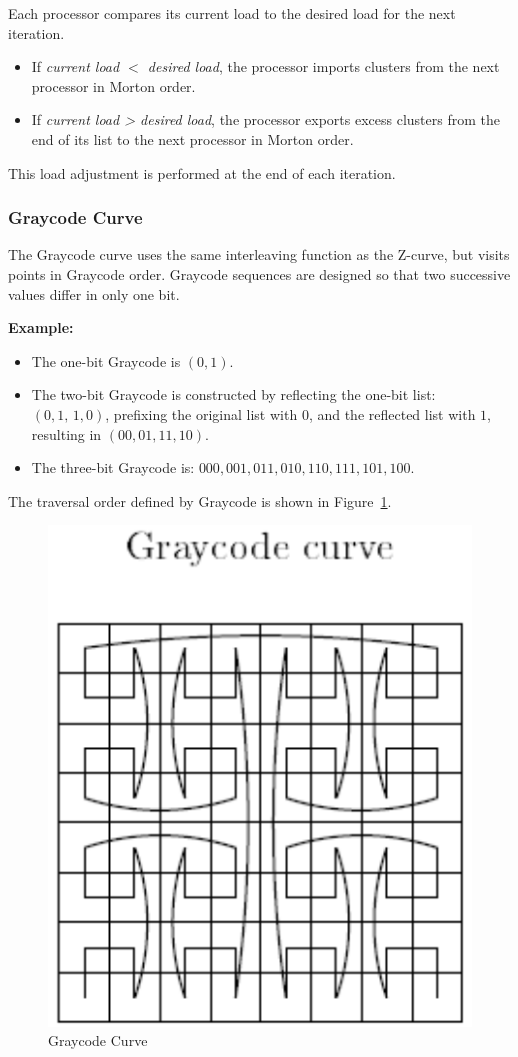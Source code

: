\documentclass[12pt]{book}
\begin{document}
Each processor compares its current load to the desired load for the next iteration. 
\begin{itemize}
    \item If \emph{current load $<$ desired load}, the processor imports clusters from the next processor in Morton order.
    \item If \emph{current load > desired load}, the processor exports excess clusters from the end of its list to the next processor in Morton order. 
\end{itemize}
This load adjustment is performed at the end of each iteration.

\subsubsection{Graycode Curve}
The Graycode curve uses the same interleaving function as the Z-curve, but visits points in Graycode order. Graycode sequences are designed so that two successive values differ in only one bit. 

\textbf{Example:} 
\begin{itemize}
    \item The one-bit Graycode is $(0,1)$.
    \item The two-bit Graycode is constructed by reflecting the one-bit list: $(0,1,\, 1,0)$, prefixing the original list with $0$, and the reflected list with $1$, resulting in $(00,01,11,10)$.
    \item The three-bit Graycode is: $000, 001, 011, 010, 110, 111, 101, 100$.
\end{itemize}

The traversal order defined by Graycode is shown in Figure~\ref{fig:graycode}. 
\begin{figure}[ht]
    \centering
    \includegraphics[width=0.45\linewidth]{images/graycode.png}
    \caption{Graycode Curve}
    \label{fig:graycode}
\end{figure}
\end{document}
